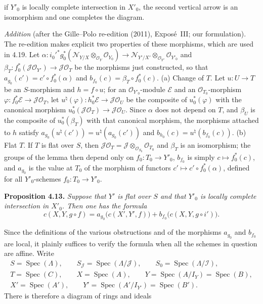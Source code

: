 \begin{center}
\end{center}

if \(Y'_0\) is locally complete intersection in \(X'_0\), the second
vertical arrow is an isomorphism and one completes the diagram.

\emph{Addition} (after the Gille--Polo re-edition (2011), Exposé~III; our
formulation). The re-edition makes explicit two properties of these
morphisms, which are used in 4.19. Let
\(\alpha\colon i_0'^*g_0^*(\mathscr N_{Y/X}\otimes_{\mathscr O_Y}\mathscr O_{Y_0})
\to\mathscr N_{Y'/X'}\otimes_{\mathscr O_{Y'}}\mathscr O_{Y'_0}\) and
\(\beta_T\colon f_0^*(\mathscr J\mathscr O_{Y'})\to\mathscr J\mathscr O_T\) be the
morphisms just constructed, so that \(a_{g_0}(c')=c'\circ f_0^*(\alpha)\) and
\(b_{f_0}(c)=\beta_T\circ f_0^*(c)\). (a) Change of \(T\). Let \(u\colon U\to T\)
be an \(S\)-morphism and \(h=f\circ u\); for an \(\mathscr O_{Y'_0}\)-module
\(\mathscr E\) and an \(\mathscr O_{T_0}\)-morphism
\(\varphi\colon f_0^*\mathscr E\to\mathscr J\mathscr O_T\), let
\(u^\natural(\varphi)\colon h_0^*\mathscr E\to\mathscr J\mathscr O_U\) be the
composite of \(u_0^*(\varphi)\) with the canonical morphism
\(u_0^*(\mathscr J\mathscr O_T)\to\mathscr J\mathscr O_U\). Since \(\alpha\) does
not depend on \(T\), and \(\beta_U\) is the composite of \(u_0^*(\beta_T)\) with
that canonical morphism, the morphisms attached to \(h\) satisfy
\(a_{g_0}(u^\natural(c'))=u^\natural(a_{g_0}(c'))\) and
\(b_{h_0}(c)=u^\natural(b_{f_0}(c))\). (b) Flat \(T\). If \(T\) is flat over
\(S\), then \(\mathscr J\mathscr O_T=\mathscr J\otimes_{\mathscr O_{S_0}}
\mathscr O_{T_0}\) and \(\beta_T\) is an isomorphism; the groups of the lemma
then depend only on \(f_0\colon T_0\to Y'_0\), \(b_{f_0}\) is simply
\(c\mapsto f_0^*(c)\), and \(a_{g_0}\) is the value at \(T_0\) of the morphism of
functors \(c'\mapsto c'\circ f_0^*(\alpha)\), defined for all \(Y'_0\)-schemes
\(f_0\colon T_0\to Y'_0\).

\medskip
\noindent{}\textbf{Proposition 4.13.}
\textit{Suppose that \(Y'\) is flat over \(S\) and that \(Y'_0\) is
locally complete intersection in \(X'_0\). Then one has the formula}
\[
 c(X,Y,g\circ f)=a_{g_0}\bigl(c(X',Y',f)\bigr)
   +b_{f_0}\bigl(c(X,Y,g\circ i')\bigr).
\]

Since the definitions of the various obstructions and of the morphisms
\(a_{g_0}\) and \(b_{f_0}\) are local, it plainly suffices to verify the
formula when all the schemes in question are affine. Write
\[
 \begin{gathered}
 S=\operatorname{Spec}(\Lambda),\qquad
 S_{\mathscr J}=\operatorname{Spec}(\Lambda/\mathscr J),\qquad
 S_0=\operatorname{Spec}(\Lambda/\mathscr I),\\
 T=\operatorname{Spec}(C),\qquad X=\operatorname{Spec}(A),\qquad
 Y=\operatorname{Spec}(A/I_Y)=\operatorname{Spec}(B),\\
 X'=\operatorname{Spec}(A'),\qquad
 Y'=\operatorname{Spec}(A'/I_{Y'})=\operatorname{Spec}(B').
 \end{gathered}
\]
There is therefore a diagram of rings and ideals

